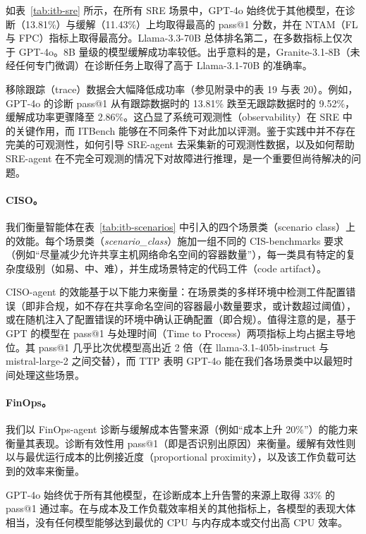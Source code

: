 如表~\ref{tab:itb-sre} 所示，在所有 SRE 场景中，GPT-4o 始终优于其他模型，在诊断（13.81\%）与缓解（11.43\%）上均取得最高的 pass@1 分数，并在 NTAM（FL 与 FPC）指标上取得最高分。Llama-3.3-70B 总体排名第二，在多数指标上仅次于 GPT-4o。8B 量级的模型缓解成功率较低。出乎意料的是，Granite-3.1-8B（未经任何专门微调）在诊断任务上取得了高于 Llama-3.1-70B 的准确率。

移除跟踪（trace）数据会大幅降低成功率（参见附录中的表 19 与表 20）。例如，GPT-4o 的诊断 pass@1 从有跟踪数据时的 13.81\% 跌至无跟踪数据时的 9.52\%，缓解成功率更骤降至 2.86\%。这凸显了系统可观测性（observability）在 SRE 中的关键作用，而 ITBench 能够在不同条件下对此加以评测。鉴于实践中并不存在完美的可观测性，如何引导 SRE-agent 去采集新的可观测性数据，以及如何帮助 SRE-agent 在不完全可观测的情况下对故障进行推理，是一个重要但尚待解决的问题。

\paragraph{CISO。} 我们衡量智能体在表~\ref{tab:itb-scenarios} 中引入的四个场景类（scenario class）上的效能。每个场景类（\textit{scenario\_class}）施加一组不同的 CIS-benchmarks 要求（例如“尽量减少允许共享主机网络命名空间的容器数量”），每一类具有特定的复杂度级别（如易、中、难），并生成场景特定的代码工件（code artifact）。

CISO-agent 的效能基于以下能力来衡量：在场景类的多样环境中检测工件配置错误（即非合规，如不存在共享命名空间的容器最小数量要求，或计数超过阈值），或在随机注入了配置错误的环境中确认正确配置（即合规）。值得注意的是，基于 GPT 的模型在 pass@1 与处理时间（Time to Process）两项指标上均占据主导地位。其 pass@1 几乎比次优模型高出近 2 倍（在 llama-3.1-405b-instruct 与 mistral-large-2 之间交替），而 TTP 表明 GPT-4o 能在我们各场景类中以最短时间处理这些场景。

\paragraph{FinOps。} 我们以 FinOps-agent 诊断与缓解成本告警来源（例如“成本上升 20\%”）的能力来衡量其表现。诊断有效性用 pass@1（即是否识别出原因）来衡量。缓解有效性则以与最优运行成本的比例接近度（proportional proximity），以及该工作负载可达到的效率来衡量。

GPT-4o 始终优于所有其他模型，在诊断成本上升告警的来源上取得 33\% 的 pass@1 通过率。在与成本及工作负载效率相关的其他指标上，各模型的表现大体相当，没有任何模型能够达到最优的 CPU 与内存成本或交付出高 CPU 效率。

